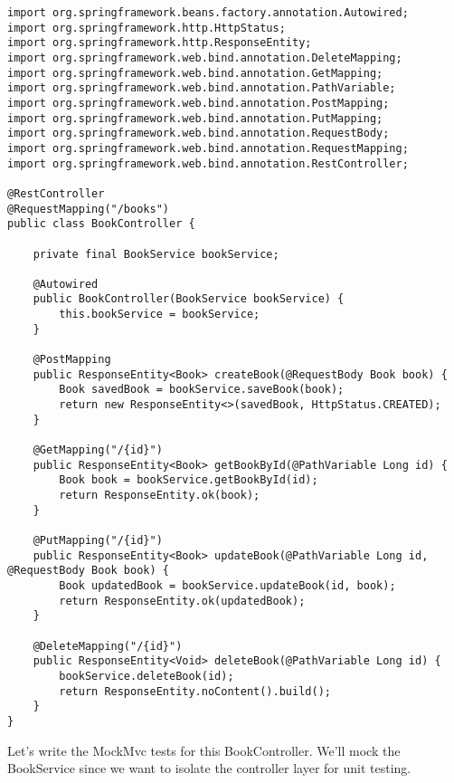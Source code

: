 \begin{lstlisting}
import org.springframework.beans.factory.annotation.Autowired;
import org.springframework.http.HttpStatus;
import org.springframework.http.ResponseEntity;
import org.springframework.web.bind.annotation.DeleteMapping;
import org.springframework.web.bind.annotation.GetMapping;
import org.springframework.web.bind.annotation.PathVariable;
import org.springframework.web.bind.annotation.PostMapping;
import org.springframework.web.bind.annotation.PutMapping;
import org.springframework.web.bind.annotation.RequestBody;
import org.springframework.web.bind.annotation.RequestMapping;
import org.springframework.web.bind.annotation.RestController;

@RestController
@RequestMapping("/books")
public class BookController {

    private final BookService bookService;

    @Autowired
    public BookController(BookService bookService) {
        this.bookService = bookService;
    }

    @PostMapping
    public ResponseEntity<Book> createBook(@RequestBody Book book) {
        Book savedBook = bookService.saveBook(book);
        return new ResponseEntity<>(savedBook, HttpStatus.CREATED);
    }

    @GetMapping("/{id}")
    public ResponseEntity<Book> getBookById(@PathVariable Long id) {
        Book book = bookService.getBookById(id);
        return ResponseEntity.ok(book);
    }

    @PutMapping("/{id}")
    public ResponseEntity<Book> updateBook(@PathVariable Long id, @RequestBody Book book) {
        Book updatedBook = bookService.updateBook(id, book);
        return ResponseEntity.ok(updatedBook);
    }

    @DeleteMapping("/{id}")
    public ResponseEntity<Void> deleteBook(@PathVariable Long id) {
        bookService.deleteBook(id);
        return ResponseEntity.noContent().build();
    }
}
\end{lstlisting}

Let's write the MockMvc tests for this BookController. We'll mock the BookService since we want to isolate the controller layer for unit testing.

